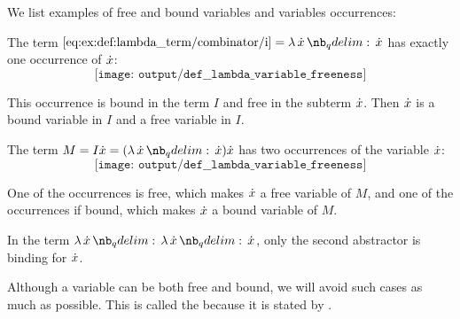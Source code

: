 \begin{example}\label{ex:def:lambda_variable_freeness}
  We list examples of free and bound variables and variables occurrences:
  \begin{thmenum}
     The term \( \ref{eq:ex:def:lambda_term/combinator/i} = \qabs \synx \synx \) has exactly one occurrence of \( {\dot{x}} \):
    \begin{equation*}
      \texttt{[image: output/def\_\_lambda\_variable\_freeness]}
    \end{equation*}

     This occurrence is bound in the term \( I \) and free in the subterm \( {\dot{x}} \). Then \( {\dot{x}} \) is a bound variable in \( I \) and a free variable in \( I \).

     The term \( M = I \synx = (\qabs \synx \synx) \synx \) has two occurrences of the variable \( {\dot{x}} \):
    \begin{equation*}
      \texttt{[image: output/def\_\_lambda\_variable\_freeness]}
    \end{equation*}

    One of the occurrences is free, which makes \( {\dot{x}} \) a free variable of \( M \), and one of the occurrences if bound, which makes \( {\dot{x}} \) a bound variable of \( M \).

     In the term \( \qabs \synx \qabs \synx \synx \), only the second abstractor is binding for \( {\dot{x}} \).
  \end{thmenum}
\end{example}

\begin{remark}\label{rem:barendregt_convention}
  Although a variable can be both free and bound, we will avoid such cases as much as possible. This is called the  because it is stated by .
\end{remark}

